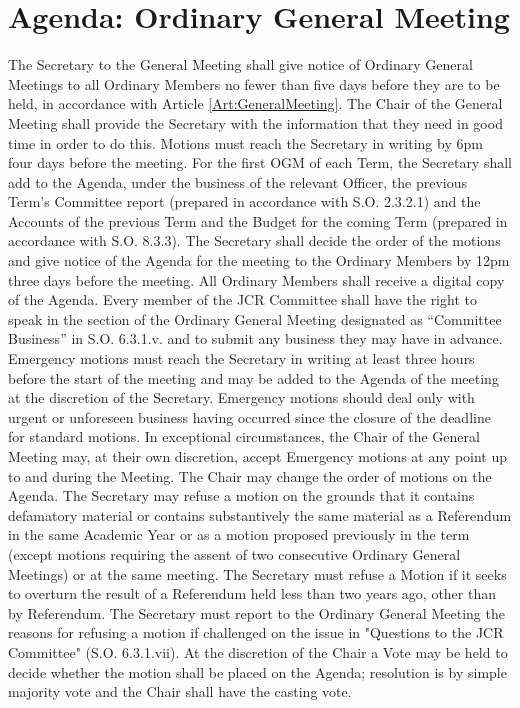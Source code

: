 \section{Agenda: Ordinary General Meeting}
\npara The Secretary to the General Meeting shall give notice of Ordinary General Meetings to all Ordinary Members no fewer than five days before they are to be held, in accordance with Article \ref{Art:GeneralMeeting}.  The Chair of the General Meeting shall provide the Secretary with the information that they need in good time in order to do this.
\npara Motions must reach the Secretary in writing by 6pm four days before the meeting.
\npara For the first OGM of each Term, the Secretary shall add to the Agenda, under the business of the relevant Officer, the previous Term's Committee report (prepared in accordance with S.O. 2.3.2.1) and the Accounts of the previous Term and the Budget for the coming Term (prepared in accordance with S.O. 8.3.3).
\npara The Secretary shall decide the order of the motions and give notice of the Agenda for the meeting to the Ordinary Members by 12pm three days before the meeting.
\npara All Ordinary Members shall receive a digital copy of the Agenda.
\npara Every member of the JCR Committee shall have the right to speak in the section of the Ordinary General Meeting designated as ``Committee Business'' in S.O. 6.3.1.v. and to submit any business they may have in advance.
\npara Emergency motions must reach the Secretary in writing at least three hours before the start of the meeting and may be added to the Agenda of the meeting at the discretion of the Secretary. Emergency motions should deal only with urgent or unforeseen business having occurred since the closure of the deadline for standard motions.
\npara In exceptional circumstances, the Chair of the General Meeting may, at their own discretion, accept Emergency motions at any point up to and during the Meeting.
\npara The Chair may change the order of motions on the Agenda.
\npara The Secretary may refuse a motion on the grounds that it contains defamatory material or contains substantively the same material as a Referendum in the same Academic Year or as a motion proposed previously in the term (except motions requiring the assent of two consecutive Ordinary General Meetings) or at the same meeting. The Secretary must refuse a Motion if it seeks to overturn the result of a Referendum held less than two years ago, other than by Referendum.  The Secretary must report to the Ordinary General Meeting the reasons for refusing a motion if challenged on the issue in "Questions to the JCR Committee" (S.O. 6.3.1.vii). At the discretion of the Chair a Vote may be held to decide whether the motion shall be placed on the Agenda; resolution is by simple majority vote and the Chair shall have the casting vote.
